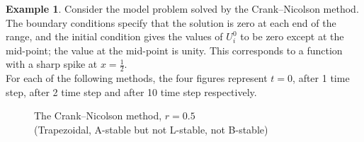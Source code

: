 \documentclass[a4paper,twoside]{ctexart}
\theoremstyle{definition}
\newtheorem{example}[definition]{Example}
\begin{document}
\begin{example}
	Consider the model problem
	solved by the Crank–Nicolson method. The boundary conditions specify
	that the solution is zero at each end of the range, and the initial condition gives the values of $U_i^0$ to be zero except at the mid-point; the value at
	the mid-point is unity. This corresponds to a function with a sharp spike
	at $x = \frac{1}{2}$.\\
	For each of the following methods, the four figures represent $t = 0$, after 1 time step, after 2 time step and after 10 time step respectively.
		\begin{figure}[H]
		\centering  %
		\caption*{The Crank–Nicolson method, $r = 0.5$\\(Trapezoidal, A-stable but not L-stable, not B-stable)}
	\end{figure}
	

\end{example}
\end{document}
